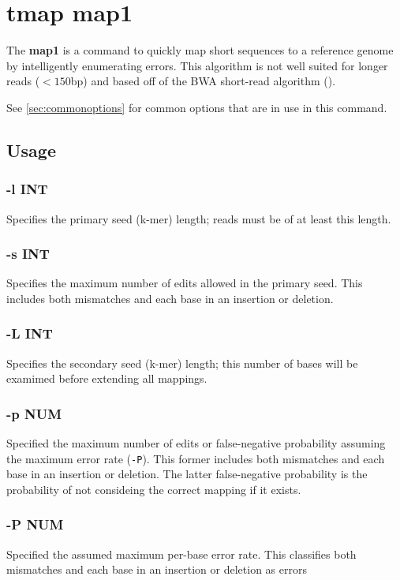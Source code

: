 \documentclass[a4paper,12pt]{book}
\newcommand{\TT}[1]{{\tt #1}} %
\newcommand{\BF}[1]{{\bf #1}} %
\begin{document}
\section{tmap map1}
\label{sec:map1}
The \BF{map1} is a command to quickly map short sequences to a reference genome by intelligently enumerating errors.
This algorithm is not well suited for longer reads ($<150$bp) and based off of the BWA short-read algorithm (\cite{BWA-short}).

See \autoref{sec:commonoptions} for common options that are in use in this command.

\subsection{Usage}

\subsubsection{-l INT}
Specifies the primary seed (k-mer) length; reads must be of at least this length.

\subsubsection{-s INT}
Specifies the maximum number of edits allowed in the primary seed.
This includes both mismatches and each base in an insertion or deletion. 

\subsubsection{-L INT}
Specifies the secondary seed (k-mer) length; this number of bases will be examimed before extending all mappings.

\subsubsection{-p NUM}
Specified the maximum number of edits or false-negative probability assuming the maximum error rate (\TT{-P}).
This former includes both mismatches and each base in an insertion or deletion. 
The latter false-negative probability is the probability of not consideing the correct mapping if it exists. 

\subsubsection{-P NUM}
Specified the assumed maximum per-base error rate.
This classifies both mismatches and each base in an insertion or deletion as errors 
\end{document}
